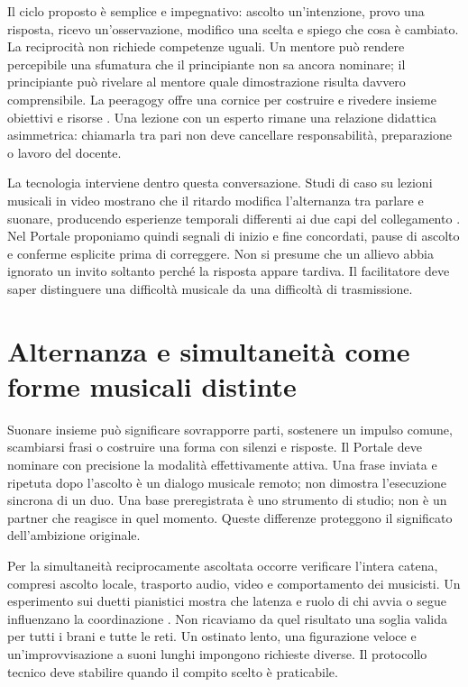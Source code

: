 Il ciclo proposto è semplice e impegnativo: ascolto un'intenzione, provo
una risposta, ricevo un'osservazione, modifico una scelta e spiego che cosa
è cambiato. La reciprocità non richiede competenze uguali. Un mentore può
rendere percepibile una sfumatura che il principiante non sa ancora nominare;
il principiante può rivelare al mentore quale dimostrazione risulta davvero
comprensibile. La peeragogy offre una cornice per costruire e rivedere insieme
obiettivi e risorse \cite{learn_peeragogy}. Una lezione con un esperto rimane
una relazione didattica asimmetrica: chiamarla tra pari non deve cancellare
responsabilità, preparazione o lavoro del docente.

La tecnologia interviene dentro questa conversazione. Studi di caso su
lezioni musicali in video mostrano che il ritardo modifica l'alternanza
tra parlare e suonare, producendo esperienze temporali differenti ai due
capi del collegamento \cite{remote_duffy}. Nel Portale proponiamo quindi
segnali di inizio e fine concordati, pause di ascolto e conferme esplicite
prima di correggere. Non si presume che un allievo abbia ignorato un
invito soltanto perché la risposta appare tardiva. Il facilitatore deve
saper distinguere una difficoltà musicale da una difficoltà di trasmissione.

\section{Alternanza e simultaneità come forme musicali distinte}

Suonare insieme può significare sovrapporre parti, sostenere un impulso
comune, scambiarsi frasi o costruire una forma con silenzi e risposte.
Il Portale deve nominare con precisione la modalità effettivamente attiva.
Una frase inviata e ripetuta dopo l'ascolto è un dialogo musicale remoto;
non dimostra l'esecuzione sincrona di un duo. Una base preregistrata è uno
strumento di studio; non è un partner che reagisce in quel momento.
Queste differenze proteggono il significato dell'ambizione originale.

Per la simultaneità reciprocamente ascoltata occorre verificare l'intera
catena, compresi ascolto locale, trasporto audio, video e comportamento
dei musicisti. Un esperimento sui duetti pianistici mostra che latenza e
ruolo di chi avvia o segue influenzano la coordinazione
\cite{remote_washburn}. Non ricaviamo da quel risultato una soglia valida
per tutti i brani e tutte le reti. Un ostinato lento, una figurazione
veloce e un'improvvisazione a suoni lunghi impongono richieste diverse.
Il protocollo tecnico deve stabilire quando il compito scelto è praticabile.

